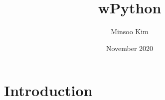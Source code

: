 \documentclass{article}
\title{wPython}
\author{Minsoo Kim}
\date{November 2020}
\begin{document}
\maketitle

\section{Introduction}
\end{document}
